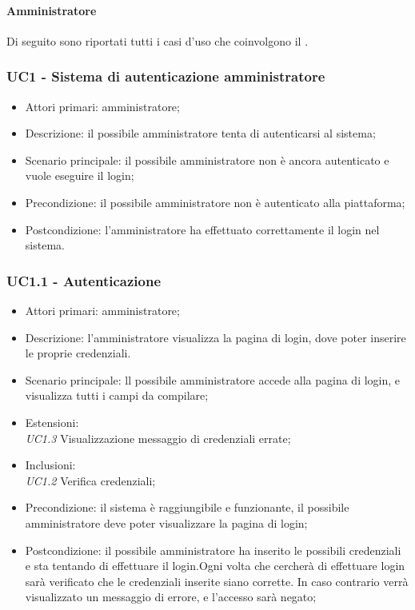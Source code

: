 \paragraph{Amministratore}
Di seguito sono riportati tutti i casi d'uso che coinvolgono il  .


\subsubsection{UC1 - Sistema di autenticazione amministratore}

\begin{itemize}
\item Attori primari: amministratore;
\item Descrizione: il possibile amministratore tenta di autenticarsi al sistema;
\item Scenario principale: il possibile amministratore non è ancora autenticato e vuole eseguire il login;
\item Precondizione: il possibile amministratore non è autenticato alla piattaforma;
\item Postcondizione: l'amministratore ha effettuato correttamente il login nel sistema.

\end{itemize}

\subsubsection{UC1.1 - Autenticazione}

\begin{itemize}
\item Attori primari: amministratore;
\item Descrizione: l'amministratore visualizza la pagina di login, dove poter inserire le proprie credenziali. 
\item Scenario principale: ll possibile amministratore accede alla pagina di login, e visualizza tutti i campi da compilare;
\item Estensioni: \\\emph{UC1.3} Visualizzazione messaggio di credenziali errate;
\item Inclusioni: \\\emph{UC1.2} Verifica credenziali;
\item Precondizione: il sistema è raggiungibile e funzionante, il possibile amministratore deve poter visualizzare la pagina di login;
\item Postcondizione: il possibile amministratore ha inserito le possibili credenziali e sta tentando di effettuare il login.Ogni volta che cercherà di effettuare
login sarà verificato che le credenziali inserite siano corrette. In caso contrario verrà visualizzato un messaggio di errore, e l'accesso sarà negato;

\end{itemize}


